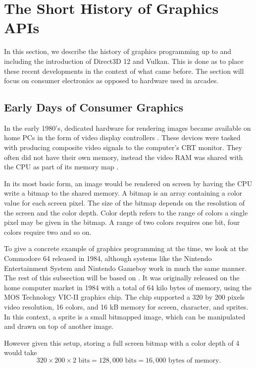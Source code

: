 \section{The Short History of Graphics \acs{API}s}\label{sec:short_history}
In this section, we describe the history of graphics programming up to and including the introduction of Direct3D 12 and Vulkan.
This is done as to place these recent developments in the context of what came before.
The section will focus on consumer electronics as opposed to hardware used in arcades.

\subsection{Early Days of Consumer Graphics}
In the early 1980's, dedicated hardware for rendering images became available on home PCs in the form of video display controllers \cite{wikiVideoDisplayController}.
These devices were tasked with producing composite video signals to the computer’s CRT monitor.
They often did not have their own memory, instead the video RAM was shared with the \gls{CPU} as part of its memory map \cite{wikipedia????shared}.


In its most basic form, an image would be rendered on screen by having the \gls{CPU} write a bitmap to the shared memory.
A bitmap is an array containing a color value for each screen pixel.
The size of the bitmap depends on the resolution of the screen and the color depth.
Color depth refers to the range of colors a single pixel may be given in the bitmap.
A range of two colors requires one bit, four colors require two and so on.


To give a concrete example of graphics programming at the time, we look at the Commodore 64 released in 1984, although systems like the Nintendo Entertainment System and Nintendo Gameboy work in much the same manner.
The rest of this subsection will be based on \citet{commodore1983commodore}.
It was originally released on the home computer market in 1984 with a total of 64 kilo bytes of memory, using the MOS Technology VIC-II graphics chip.
The chip supported a 320 by 200 pixels video resolution, 16 colors, and 16 kB memory for screen, character, and sprites.
In this context, a sprite is a small bitmapped image, which can be manipulated and drawn on top of another image.

However given this setup, storing a full screen bitmap with a color depth of 4 would take
$$320\times 200\times 2 \text{ bits} = 128,000 \text{ bits} = 16,000 \text{ bytes of memory.}$$

